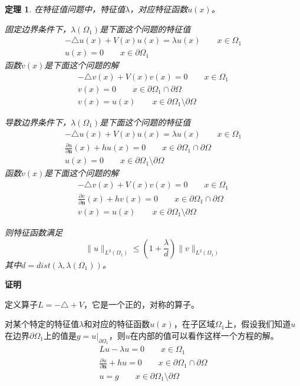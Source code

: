 \documentclass[12pt,a4paper]{article}
\newtheorem{theorem}{定理}
\begin{document}
\begin{theorem}

在特征值问题中，特征值$\lambda$，对应特征函数$u(x)$。

固定边界条件下，$\lambda(\Omega_1)$是下面这个问题的特征值
\begin{eqnarray}
-\triangle u(x) + V(x) u(x) = \lambda u(x) \qquad x \in \Omega_1 \\
u(x) = 0 \qquad x \in \partial \Omega_1
\end{eqnarray}
函数$v(x)$是下面这个问题的解
\begin{eqnarray}
-\triangle v(x) + V(x) v(x) = 0 \qquad x \in \Omega_1 \\
v(x) = 0 \qquad x \in \partial \Omega_1 \cap \partial \Omega \\
v(x) = u(x) \qquad x \in \partial \Omega_1 \setminus \partial \Omega
\end{eqnarray}

导数边界条件下，$\lambda(\Omega_1)$是下面这个问题的特征值
\begin{eqnarray}
-\triangle u(x) + V(x) u(x) = \lambda u(x) \qquad x \in \Omega_1 \\
\frac{\partial u}{\partial \mathbf{n}}(x) + h u(x) = 0 \qquad x \in \partial \Omega_1 \cap \partial \Omega \\
u(x) = 0 \qquad x \in \partial \Omega_1 \setminus \partial \Omega
\end{eqnarray}
函数$v(x)$是下面这个问题的解
\begin{eqnarray}
-\triangle v(x) + V(x) v(x) = 0 \qquad x \in \Omega_1 \\
\frac{\partial v}{\partial \mathbf{n}}(x) + h v(x) = 0 \qquad x \in \partial \Omega_1 \cap \partial \Omega \\
v(x) = u(x) \qquad x \in \partial \Omega_1 \setminus \partial \Omega
\end{eqnarray}

则特征函数满足
\begin{equation}
\|u\|_{L^2(\Omega_1)} \leq (1 + \frac{\lambda}{d}) \|v\|_{L^2(\Omega_1)}
\end{equation}
其中$d = dist(\lambda, \lambda(\Omega_1))$。

\end{theorem}

\textbf{证明}

定义算子$L = -\triangle + V$，它是一个正的，对称的算子。

对某个特定的特征值$\lambda$和对应的特征函数$u(x)$，在子区域$\Omega_1$上，假设我们知道$u$在边界$\partial \Omega_1$上的值是$g = u|_{\partial \Omega_1}$，则$u$在内部的值可以看作这样一个方程的解。
\begin{eqnarray}
L u - \lambda u = 0 \qquad x \in \Omega_1 \\
\frac{\partial u}{\partial \mathbf{n}} + h u = 0 \qquad x \in \partial \Omega_1 \cap \partial \Omega \\
u = g \qquad x \in \partial \Omega_1 \setminus \partial \Omega
\end{eqnarray}
\end{document}
